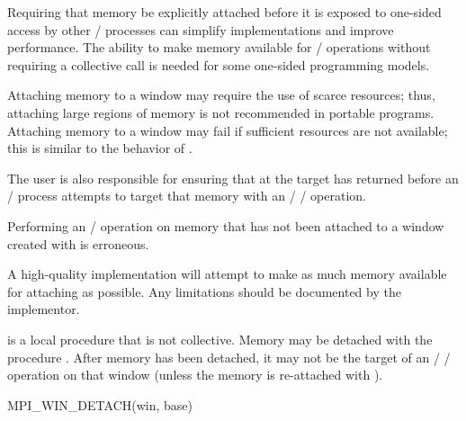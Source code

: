 \begin{rationale}
Requiring that memory be explicitly attached before it is exposed to
one-sided access by other \mpi/ processes can
simplify
implementations and improve performance. The ability to make memory
available for \RMA/ operations without requiring a collective
 call is needed for some one-sided programming
models.
\end{rationale}

\begin{users}
Attaching memory to a window may require the use of scarce resources; thus,
attaching large regions of memory is not recommended in portable
programs.  Attaching memory to a window may fail if sufficient resources are
not available; this is similar to the behavior of
.

The user is also responsible for ensuring that  at
the target has returned before an \mpi/ process attempts to target that
memory with an \MPI/ \RMA/ operation.

Performing an \RMA/ operation on memory that has not been attached to
a window created with  is
erroneous.   %
\end{users}

\begin{implementors}
A high-quality implementation will attempt to make as much memory
available for attaching as possible. Any limitations should be
documented by the implementor.
\end{implementors}

 is a local procedure that is not collective.
%
Memory may be detached with the procedure
. After memory has been
detached, it may not be the target of an \MPI/ \RMA/ operation on 
that window (unless the 
memory is re-attached with ).

\begin{funcdef}{MPI\_WIN\_DETACH}{(\mbox{win}, \mbox{base})}
\end{funcdef}

